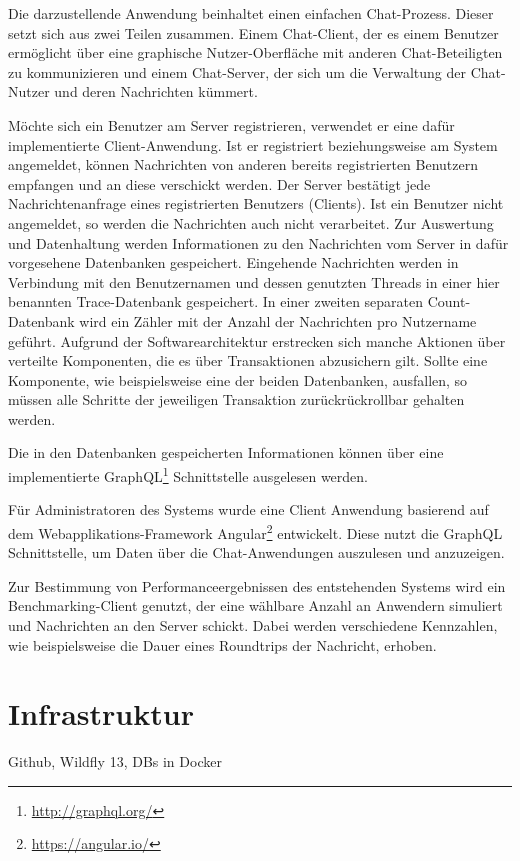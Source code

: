 \documentclass[10pt,journal,compsoc]{IEEEtran}
\begin{document}
Die darzustellende Anwendung beinhaltet einen einfachen Chat-Prozess. Dieser setzt sich aus zwei Teilen zusammen. Einem Chat-Client, der es einem Benutzer ermöglicht über eine graphische Nutzer-Oberfläche mit anderen Chat-Beteiligten zu kommunizieren und einem Chat-Server, der sich um die Verwaltung der Chat-Nutzer und deren Nachrichten kümmert. 

Möchte sich ein Benutzer am Server registrieren, verwendet er eine dafür implementierte Client-Anwendung. Ist er registriert beziehungsweise am System angemeldet, können Nachrichten von anderen bereits registrierten Benutzern empfangen und an diese verschickt werden. Der Server bestätigt jede Nachrichtenanfrage eines registrierten Benutzers (Clients). Ist ein Benutzer nicht angemeldet, so werden die Nachrichten auch nicht verarbeitet. Zur Auswertung und Datenhaltung werden Informationen zu den Nachrichten vom Server in dafür vorgesehene Datenbanken gespeichert. Eingehende Nachrichten werden in Verbindung mit den Benutzernamen und dessen genutzten Threads in einer hier benannten Trace-Datenbank gespeichert. In einer zweiten separaten Count-Datenbank wird ein Zähler mit der Anzahl der Nachrichten pro Nutzername geführt. Aufgrund der Softwarearchitektur erstrecken sich manche Aktionen über verteilte Komponenten, die es über Transaktionen abzusichern gilt. Sollte eine Komponente, wie beispielsweise eine der beiden Datenbanken, ausfallen, so müssen alle Schritte der jeweiligen Transaktion zurückrückrollbar gehalten werden.

Die in den Datenbanken gespeicherten Informationen können über eine implementierte GraphQL\footnote{\url{http://graphql.org/}} Schnittstelle ausgelesen werden.

Für Administratoren des Systems wurde eine Client Anwendung basierend auf dem Webapplikations-Framework Angular\footnote{\url{https://angular.io/}} entwickelt. Diese nutzt die GraphQL Schnittstelle, um Daten über die Chat-Anwendungen auszulesen und anzuzeigen.

Zur Bestimmung von Performanceergebnissen des entstehenden Systems wird ein Benchmarking-Client genutzt, der eine wählbare Anzahl an Anwendern simuliert und Nachrichten an den Server schickt. Dabei werden verschiedene Kennzahlen, wie beispielsweise die Dauer eines Roundtrips der Nachricht, erhoben.

\section{Infrastruktur}
Github, Wildfly 13, DBs in Docker
\end{document}
